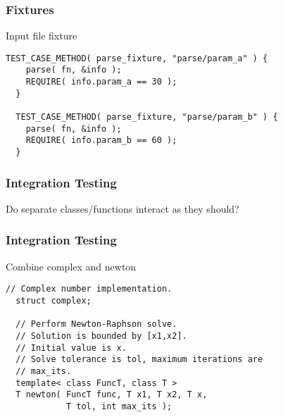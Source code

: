 \begin{frame}[fragile]
  \frametitle{Fixtures}
  \begin{block}{Input file fixture}
    \begin{lstlisting}[style=C]
  TEST_CASE_METHOD( parse_fixture, "parse/param_a" ) {
    parse( fn, &info );
    REQUIRE( info.param_a == 30 );
  }

  TEST_CASE_METHOD( parse_fixture, "parse/param_b" ) {
    parse( fn, &info );
    REQUIRE( info.param_b == 60 );
  }
    \end{lstlisting}
  \end{block}
\end{frame}

\begin{frame}
  \frametitle{Integration Testing}
  \vspace{4cm}
  {\Large\color{Base09}Do separate classes/functions interact as they should?}
\end{frame}

\begin{frame}[fragile]
  \frametitle{Integration Testing}
  \begin{block}{Combine complex and newton}
    \begin{lstlisting}[style=C]
  // Complex number implementation.
  struct complex;

  // Perform Newton-Raphson solve.
  // Solution is bounded by [x1,x2].
  // Initial value is x.
  // Solve tolerance is tol, maximum iterations are
  // max_its.
  template< class FuncT, class T >
  T newton( FuncT func, T x1, T x2, T x,
            T tol, int max_its );
    \end{lstlisting}
  \end{block}
\end{frame}

